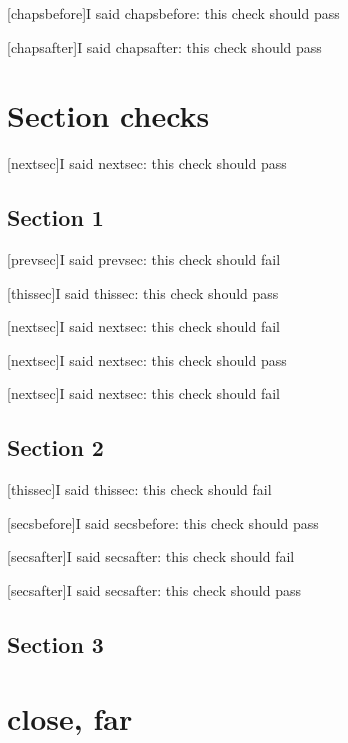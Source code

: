 \documentclass{book}
\begin{document}
[chapsbefore]{I said chapsbefore: this check should pass}

[chapsafter]{I said chapsafter: this check should pass}

\chapter{Section checks}

[nextsec]{I said nextsec: this check should pass}


\section{Section 1}

[prevsec]{I said prevsec: this check should fail}

[thissec]{I said thissec: this check should pass}

[nextsec]{I said nextsec: this check should fail}

[nextsec]{I said nextsec: this check should pass}

[nextsec]{I said nextsec: this check should fail}


\section{Section 2}

[thissec]{I said thissec: this check should fail}

[secsbefore]{I said secsbefore: this check should pass}

[secsafter]{I said secsafter: this check should fail}

[secsafter]{I said secsafter: this check should pass}

\section{Section 3}

\chapter{close, far}
\label{cha:close-far}
\end{document}
